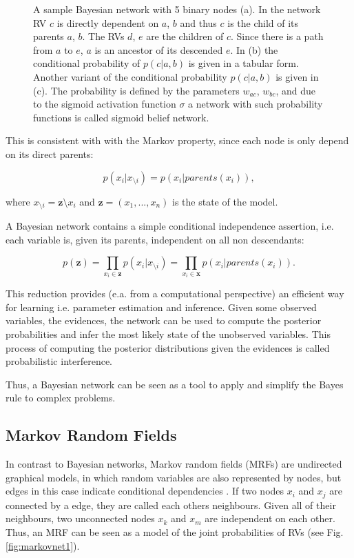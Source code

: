 \begin{figure}
\begin{subfigure}[t]{.33\textwidth}
  		\caption{}
  		\label{fig:sub3}
	\end{subfigure}
	\caption[A sample Bayesian network with 5 binary nodes.]{A sample Bayesian network with 5 binary nodes (a). In the network RV $c$ is directly dependent on $a$, $b$ and thus $c$ is the child of its parents $a$, $b$. The RVs $d$, $e$ are the children of $c$. Since there is a path from $a$ to $e$, $a$ is an ancestor of its descended $e$. In (b) the conditional probability of $p(c |a , b)$ is given in a tabular form. Another variant of the conditional probability $p(c |a , b)$ is given in (c). The probability is defined by the parameters $w_{ac}$, $w_{bc}$, and due to the sigmoid activation function $\sigma$ a network with such probability functions is called sigmoid belief network.}
	\label{fig:bayesnet}
\end{figure}

This is consistent with with the Markov property, since each node is only depend on its direct parents:

\[
p(x_i | x_{\setminus i}) = p(x_i | parents(x_i) ),
\]

where $x_{\setminus i} = \textbf{z} \setminus x_i$ and $\textbf{z} = (x_1, ... , x_n)$ is the state of the model.


A Bayesian network contains a simple conditional independence assertion, i.e. each variable is, given its parents, independent on all non descendants:

\[
p(\textbf{z}) = \prod_{x_i \in \textbf{z}} p(x_i | x_{\setminus i}) = \prod_{x_i \in \textbf{x}} p(x_i | parents(x_i) ) .
\]

This reduction provides (e.a. from a computational perspective) an efficient way for learning i.e. parameter estimation and inference.
Given some observed variables, the evidences, the network can be used to compute the posterior probabilities and infer the most likely state of the unobserved variables.
This process of computing the posterior distributions given the evidences is called probabilistic interference.

Thus, a Bayesian network can be seen as a tool to apply and simplify the Bayes rule to complex problems.   

\subsection{Markov Random Fields} \label{c:markovnet}

In contrast to Bayesian networks, Markov random fields (MRFs) are undirected graphical models, in which random variables are also represented by nodes, but edges in this case indicate conditional dependencies \cite{Goodfellow-et-al-2016-Book}\cite{murphy2012machine}.
If two nodes $x_i$ and $x_j$ are connected by a edge, they are called each others neighbours.
Given all of their neighbours, two unconnected nodes $x_k$ and $x_m$ are independent on each other.
Thus, an MRF can be seen as a model of the joint probabilities of RVs (see Fig. \ref{fig:markovnet1}).

